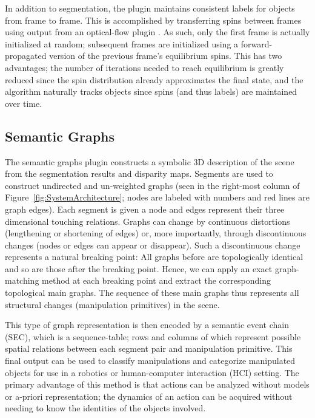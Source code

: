 In addition to segmentation, the plugin maintains consistent labels for objects from frame to frame. This is accomplished by transferring spins between frames using output from an optical-flow plugin \cite{Abramov_3DSegmentation}. As such, only the first frame is actually initialized at random; subsequent frames are initialized using a forward-propagated version of the previous frame's equilibrium spins. This has two advantages; the number of iterations needed to reach equilibrium is greatly reduced since the spin distribution already approximates the final state, and the algorithm naturally tracks objects since spins (and thus labels) are maintained over time.
 
\subsection{Semantic Graphs}
The semantic graphs plugin constructs a symbolic 3D description of the scene from the segmentation results and disparity maps. Segments are used to construct undirected and un-weighted graphs (seen in the right-most column of Figure~\ref{fig:SystemArchitecture}; nodes are labeled with numbers and red lines are graph edges). Each segment is given a node and edges represent their three dimensional touching relations. Graphs can change by continuous distortions (lengthening or shortening of edges) or, more importantly, through discontinuous changes (nodes or edges can appear or disappear). Such a discontinuous change represents a natural breaking point: All graphs before are topologically identical and so are those after the breaking point. Hence, we can apply an exact graph-matching method \cite{Sumsi08} at each breaking point and extract the corresponding topological main graphs. The sequence of these main graphs thus represents all structural changes (manipulation primitives) in the scene. 

This type of graph representation is then encoded by a semantic event chain (SEC), which is a sequence-table; rows and columns of which represent possible spatial relations between each segment pair and manipulation primitive. This final output can be used to classify manipulations and categorize manipulated objects for use in a robotics or human-computer interaction (HCI) setting\cite{Aksoy10,Aksoy11}. The primary advantage of this method is that actions can be analyzed without models or a-priori representation; the dynamics of an action can be acquired without needing to know the identities of the objects involved.

